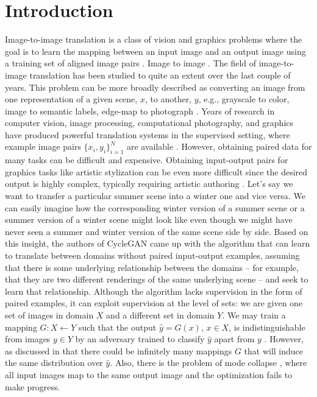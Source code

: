 \documentclass[10pt,twocolumn,letterpaper]{article}
\begin{document}
\section{Introduction}
Image-to-image translation is a class of vision and graphics problems where the goal 
is to learn the mapping between an input image and an output image using a training 
set of aligned image pairs \cite{cyclegan}. Image to image \cite{cyclegan}. The field 
of image-to-image translation has been studied to quite an extent over the last couple 
of years. This problem can be more broadly described as converting an image from 
one representation of a given scene, $x$, to another, $y$, e.g., grayscale to color, 
image to semantic labels, edge-map to photograph \cite{pix2pix, cyclegan}. Years 
of research in computer vision, image processing, computational photography, 
and graphics have produced powerful translation systems in the supervised setting, 
where example image pairs $\{x_i , y_i\}_{i=1}^N$ are available \cite{rel1, rel2, rel3, 
rel4, rel5, rel6, rel7, rel8, rel9, rel10}. However, obtaining paired data for many 
tasks can be difficult and expensive. Obtaining input-output pairs for graphics 
tasks like artistic stylization can be even more difficult since the desired output 
is highly complex, typically requiring artistic authoring \cite{cyclegan}. Let's say 
we want to transfer a particular summer scene into a winter one and vice versa. 
We can easily imagine how the corresponding winter version of a summer scene 
or a summer version of a winter scene might look like even though we might have 
never seen a summer and winter version of the same scene side by side. Based on 
this insight, the authors of CycleGAN \cite{cyclegan} came up with the algorithm 
that can learn to translate between domains without paired input-output examples, 
assuming that there is some underlying relationship between the domains – for 
example, that they are two different renderings of the same underlying scene – and seek to learn that relationship. Although the algorithm lacks supervision in the form 
of paired examples, it can exploit supervision at the level of sets: we are given one 
set of images in domain $X$ and a different set in domain $Y$. We may train a mapping 
$G : X \leftarrow Y$ such that the output $\hat{y} = G(x)$, $x \in X$, is indistinguishable from 
images $y \in Y$ by an adversary trained to classify $\hat{y}$ apart from $y$ \cite{cyclegan}. However,
as discussed in \cite{cyclegan} that there could be infinitely many mappings $G$ that will induce the same distribution over $\hat{y}$. Also, there is the problem of mode collapse \cite{gan1}, where all input images map to the same output image and the optimization fails to make progress.
\end{document}
